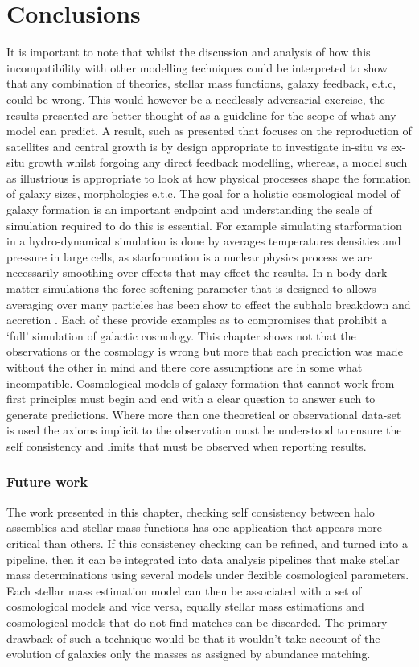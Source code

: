 \section{Conclusions}

It is important to note that whilst the discussion and analysis of how this incompatibility with other modelling techniques could be interpreted to show that any combination of \LCDM theories, stellar mass functions, galaxy feedback, e.t.c, could be wrong. This would however be a needlessly adversarial exercise, the results presented are better thought of as a guideline for the scope of what any model can predict. A result, such as presented that focuses on the reproduction of satellites and central growth is by design appropriate to investigate in-situ vs ex-situ growth whilst forgoing any direct feedback modelling, whereas, a model such as illustrious is appropriate to look at how physical processes shape the formation of galaxy sizes, morphologies e.t.c. The goal for a holistic cosmological model of galaxy formation is an important endpoint and understanding the scale of simulation required to do this is essential. For example simulating starformation in a hydro-dynamical simulation is done by averages temperatures densities and pressure in large cells, as starformation is a nuclear physics process we are necessarily smoothing over effects that may effect the results. In n-body dark matter simulations the force softening parameter that is designed to allows averaging over many particles has been show to effect the subhalo breakdown and accretion \cite{vandenBosch2018DisruptionFiction}. Each of these provide examples as to compromises that prohibit a `full' simulation of galactic cosmology. This chapter shows not that the observations or the \LCDM cosmology is wrong but more that each prediction was made without the other in mind and there core assumptions are in some what incompatible. Cosmological models of galaxy formation that cannot work from first principles must begin and end with a clear question to answer such to generate predictions. Where more than one theoretical or observational data-set is used the axioms implicit to the observation must be understood to ensure the self consistency and limits that must be observed when reporting results.

\subsubsection{Future work}
The work presented in this chapter, checking self consistency between \LCDM halo assemblies and stellar mass functions has one application that appears more critical than others. If this consistency checking can be refined, and turned into a pipeline, then it can be integrated into data analysis pipelines that make stellar mass determinations using several models under flexible cosmological parameters. Each stellar mass estimation model can then be associated with a set of cosmological models and vice versa, equally stellar mass estimations and cosmological models that do not find matches can be discarded. The primary drawback of such a technique would be that it wouldn't take account of the evolution of galaxies only the masses as assigned by abundance matching. 

